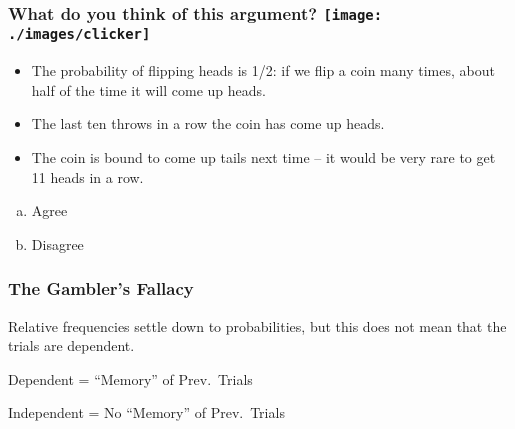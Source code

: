 \begin{frame}

\frametitle{What do you think of this argument? \hfill \texttt{[image: ./images/clicker]}}
\begin{itemize}
	\item The probability of flipping heads is 1/2: if we flip a coin many times, about half of the time it will come up heads.
	\item The last ten throws in a row the coin has come up heads.
	\item The coin is bound to come up tails next time -- it would be very rare to get 11 heads in a row.
\end{itemize}

\begin{enumerate}[(a)]
	\item Agree
	\item Disagree
\end{enumerate}

\end{frame}
\begin{frame}

\frametitle{The Gambler's Fallacy}

\begin{alertblock}{Relative frequencies settle down to probabilities, but this does not mean that the trials are dependent.}\end{alertblock}


\begin{block}{Dependent = ``Memory'' of Prev.\ Trials}\end{block}

\begin{block}{Independent = No ``Memory'' of Prev.\ Trials}\end{block}



\end{frame}
%
%
